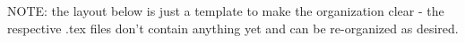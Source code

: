
\label{ch:glissade}
NOTE: the layout below is just a template to make the organization clear - the respective .tex files don't contain anything yet and can be re-organized as desired.








